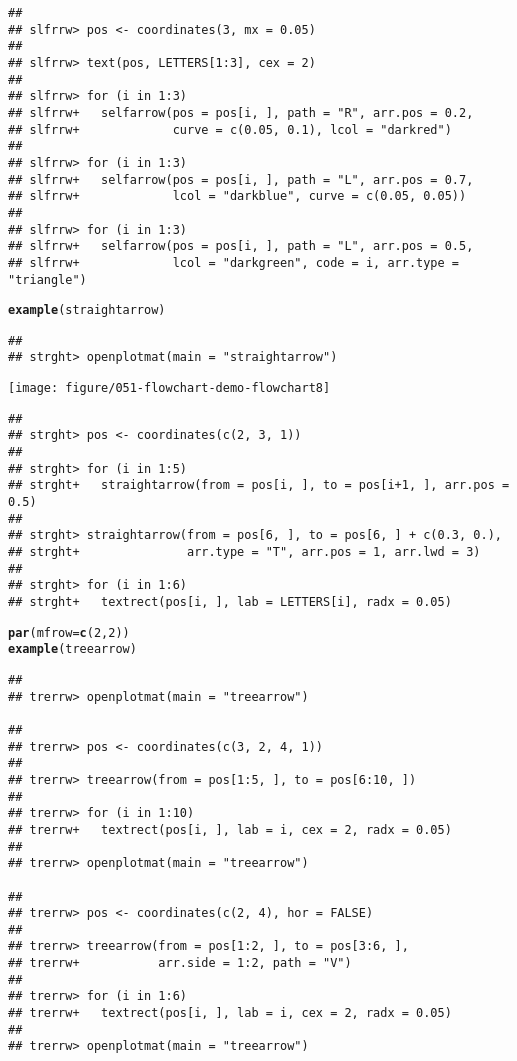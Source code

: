 \documentclass{article}\usepackage{graphicx, color}
\makeatletter
\def\maxwidth{ %
  \ifdim\Gin@nat@width>\linewidth
    \linewidth
  \else
    \Gin@nat@width
  \fi
}
\newcommand{\hlfunctioncall}[1]{\textcolor[rgb]{0.501960784313725,0,0.329411764705882}{\textbf{#1}}}%
\newenvironment{kframe}{%
 \def\at@end@of@kframe{}%
 \ifinner\ifhmode%
  \def\at@end@of@kframe{\end{minipage}}%
  \begin{minipage}{\columnwidth}%
 \fi\fi%
 \def\FrameCommand##1{\hskip\@totalleftmargin \hskip-\fboxsep
 \colorbox{shadecolor}{##1}\hskip-\fboxsep
     \hskip-\linewidth \hskip-\@totalleftmargin \hskip\columnwidth}%
 \MakeFramed {\advance\hsize-\width
   \@totalleftmargin\z@ \linewidth\hsize
   \@setminipage}}%
 {\par\unskip\endMakeFramed%
 \at@end@of@kframe}
\newenvironment{knitrout}{}{} %
\makeatother
\begin{document}
\begin{knitrout}
\begin{kframe}
\begin{verbatim}
## 
## slfrrw> pos <- coordinates(3, mx = 0.05)
## 
## slfrrw> text(pos, LETTERS[1:3], cex = 2)
## 
## slfrrw> for (i in 1:3) 
## slfrrw+   selfarrow(pos = pos[i, ], path = "R", arr.pos = 0.2,
## slfrrw+             curve = c(0.05, 0.1), lcol = "darkred")
## 
## slfrrw> for (i in 1:3) 
## slfrrw+   selfarrow(pos = pos[i, ], path = "L", arr.pos = 0.7,
## slfrrw+             lcol = "darkblue", curve = c(0.05, 0.05))
## 
## slfrrw> for (i in 1:3) 
## slfrrw+   selfarrow(pos = pos[i, ], path = "L", arr.pos = 0.5,
## slfrrw+             lcol = "darkgreen", code = i, arr.type = "triangle")
\end{verbatim}
\begin{alltt}
\hlfunctioncall{example}(straightarrow)
\end{alltt}
\begin{verbatim}
## 
## strght> openplotmat(main = "straightarrow")
\end{verbatim}
\end{kframe}
\texttt{[image: figure/051-flowchart-demo-flowchart8]} 
\begin{kframe}\begin{verbatim}
## 
## strght> pos <- coordinates(c(2, 3, 1))
## 
## strght> for (i in 1:5) 
## strght+   straightarrow(from = pos[i, ], to = pos[i+1, ], arr.pos = 0.5)
## 
## strght> straightarrow(from = pos[6, ], to = pos[6, ] + c(0.3, 0.), 
## strght+               arr.type = "T", arr.pos = 1, arr.lwd = 3)    
## 
## strght> for (i in 1:6) 
## strght+   textrect(pos[i, ], lab = LETTERS[i], radx = 0.05)
\end{verbatim}
\begin{alltt}
\hlfunctioncall{par}(mfrow = \hlfunctioncall{c}(2, 2))
\hlfunctioncall{example}(treearrow)
\end{alltt}
\begin{verbatim}
## 
## trerrw> openplotmat(main = "treearrow")

## 
## trerrw> pos <- coordinates(c(3, 2, 4, 1))
## 
## trerrw> treearrow(from = pos[1:5, ], to = pos[6:10, ])
## 
## trerrw> for (i in 1:10) 
## trerrw+   textrect(pos[i, ], lab = i, cex = 2, radx = 0.05)
## 
## trerrw> openplotmat(main = "treearrow")

## 
## trerrw> pos <- coordinates(c(2, 4), hor = FALSE)
## 
## trerrw> treearrow(from = pos[1:2, ], to = pos[3:6, ], 
## trerrw+           arr.side = 1:2, path = "V")
## 
## trerrw> for (i in 1:6) 
## trerrw+   textrect(pos[i, ], lab = i, cex = 2, radx = 0.05)
## 
## trerrw> openplotmat(main = "treearrow")


\end{verbatim}
\end{kframe}
\end{knitrout}
\end{document}
